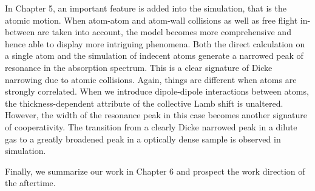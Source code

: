 In Chapter 5, an important feature is added into the simulation, that is the atomic motion. When atom-atom and atom-wall collisions as well as free flight in-between are taken into account, the model becomes more comprehensive and hence able to display more intriguing phenomena. Both the direct calculation on a single atom and the simulation of indecent atoms generate a narrowed peak of resonance in the absorption spectrum. This is a clear signature of Dicke narrowing due to atomic collisions. Again, things are different when atoms are strongly correlated. When we introduce dipole-dipole interactions between atoms, the thickness-dependent attribute of the collective Lamb shift is unaltered. However, the width of the resonance peak in this case becomes another signature of cooperativity. The transition from a clearly Dicke narrowed peak in a dilute gas to a greatly broadened peak in a optically dense sample is observed in simulation.

Finally, we summarize our work in Chapter 6 and prospect the work direction of the aftertime.







